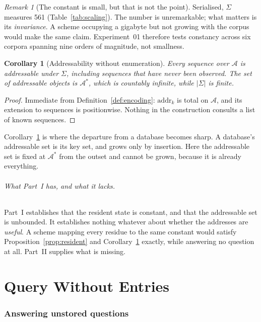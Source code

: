 \documentclass[11pt,twocolumn,a4paper]{article}
\newcommand{\addr}{\mathrm{addr}}
\newcommand{\Res}{\mathcal{A}}
\newcommand{\Sch}{\Sigma}
\theoremstyle{plain}
\newtheorem{corollary}[theorem]{Corollary}
\theoremstyle{definition}
\theoremstyle{remark}
\newtheorem{remark}{Remark}
\begin{document}
\begin{remark}[The constant is small, but that is not the point]
\label{rem:small}
Serialised, $\Sch$ measures \SI{561}{\byte}
(Table~\ref{tab:scaling}). The number is unremarkable; what matters is its
\emph{invariance}. A scheme occupying a gigabyte but not growing with the
corpus would make the same claim. Experiment~01 therefore tests constancy
across six corpora spanning nine orders of magnitude, not smallness.
\end{remark}

\begin{corollary}[Addressability without enumeration]
\label{cor:addressable}
Every sequence over $\Res$ is addressable under $\Sch$, including sequences
that have never been observed. The set of addressable objects is
$\Res^{*}$, which is countably infinite, while $|\Sch|$ is finite.
\end{corollary}

\begin{proof}
Immediate from Definition~\ref{def:encoding}: $\addr_{k}$ is total on
$\Res$, and its extension to sequences is positionwise. Nothing in the
construction consults a list of known sequences.
\end{proof}

Corollary~\ref{cor:addressable} is where the departure from a database
becomes sharp. A database's addressable set is its key set, and grows only
by insertion. Here the addressable set is fixed at $\Res^{*}$ from the
outset and cannot be grown, because it is already everything.

\paragraph{What Part~I has, and what it lacks.}
Part~I establishes that the resident state is constant, and that the
addressable set is unbounded. It establishes nothing whatever about whether
the addresses are \emph{useful}. A scheme mapping every residue to the same
constant would satisfy Proposition~\ref{prop:resident} and
Corollary~\ref{cor:addressable} exactly, while answering no question at all.
Part~II supplies what is missing.

\part{Query Without Entries}
\section{Answering unstored questions}
\label{sec:query}
\end{document}
